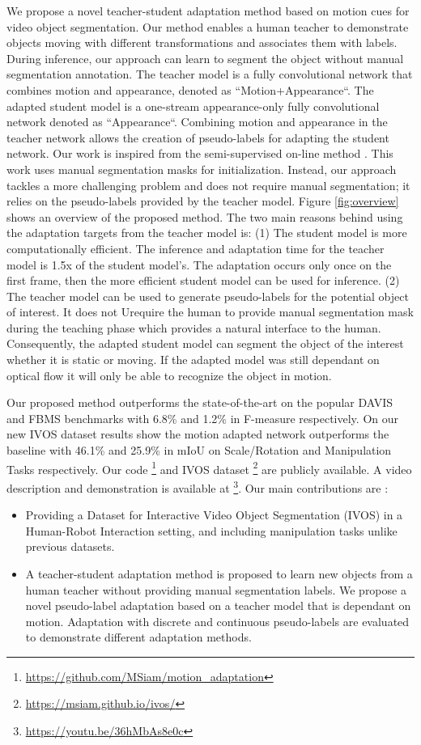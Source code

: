 \documentclass[letterpaper, 10 pt, conference]{ieeeconf}
\begin{document}
We propose a novel teacher-student adaptation method based on motion cues for video object segmentation. Our method enables a human teacher to demonstrate objects moving with different transformations and associates them with labels. During inference, our approach can learn to segment the object without manual segmentation annotation. The teacher model is a fully convolutional network that combines motion and appearance, denoted as ``Motion+Appearance``. The adapted student model is a one-stream appearance-only fully convolutional network denoted as ``Appearance``. Combining motion and appearance in the teacher network allows the creation of pseudo-labels for adapting the student network. Our work is inspired from the semi-supervised on-line method \cite{voigtlaender2017online}. This work uses manual segmentation masks for initialization. Instead, our approach tackles a more challenging problem and does not require manual segmentation; it relies on the pseudo-labels provided by the teacher model. Figure \ref{fig:overview} shows an overview of the proposed method. The two main reasons behind using the adaptation targets from the teacher model is: (1) The student model is more computationally efficient. The inference and adaptation time for the teacher model is 1.5x of the student model's. The adaptation occurs only once on the first frame, then the more efficient student model can be used for inference. (2) The teacher model can be used to generate pseudo-labels for the potential object of interest. It does not Urequire the human to provide manual segmentation mask during the teaching phase which provides a natural interface to the human. Consequently, the adapted student model can segment the object of the interest whether it is static or moving. If the adapted model was still dependant on optical flow it will only be able to recognize the object in motion. 

Our proposed method outperforms the state-of-the-art on the popular DAVIS \cite{Perazzi2016} and FBMS \cite{ochs2014segmentation} benchmarks with 6.8\% and 1.2\% in F-measure respectively. On our new IVOS dataset results show the motion adapted network outperforms the baseline with 46.1\% and 25.9\% in mIoU on Scale/Rotation and Manipulation Tasks respectively. Our code \footnote{\url{https://github.com/MSiam/motion_adaptation}} and IVOS dataset \footnote{\url{https://msiam.github.io/ivos/}} are publicly available. A video description and demonstration is available at \footnote{\url{https://youtu.be/36hMbAs8e0c}}. Our main contributions are :
\begin{itemize}
\item Providing a Dataset for Interactive Video Object Segmentation (IVOS) in a Human-Robot Interaction setting, and including manipulation tasks unlike previous datasets.
\item A teacher-student adaptation method is proposed to learn new objects from a human teacher without providing manual segmentation labels. We propose a novel pseudo-label adaptation based on a teacher model that is dependant on motion. Adaptation with discrete and continuous pseudo-labels are evaluated to demonstrate different adaptation methods.
\end{itemize}
\end{document}
